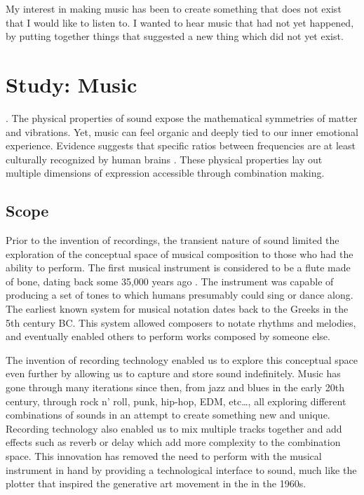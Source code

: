 \begin{savequote}[75mm]
My interest in making music has been to create something that does not exist that I would like to listen to. I wanted to hear music that had not yet happened, by putting together things that suggested a new thing which did not yet exist.
\end{savequote}

\chapter{Study: Music}




. The physical properties of sound expose the mathematical symmetries of matter and vibrations. Yet, music can feel organic and deeply tied to our inner emotional experience. Evidence suggests that specific ratios between frequencies are at least culturally recognized by human brains \citep{Jacoby2019}. These physical properties lay out multiple dimensions of expression accessible through combination making. 

\section{Scope}

Prior to the invention of recordings, the transient nature of sound limited the exploration of the conceptual space of musical composition to those who had the ability to perform. The first musical instrument is considered to be a flute made of bone, dating back some 35,000 years ago \citep{Conard2009}. The instrument was capable of producing a set of tones to which humans presumably could sing or dance along. The earliest known system for musical notation dates back to the Greeks in the 5th century BC. This system allowed composers to notate rhythms and melodies, and eventually enabled others to perform works composed by someone else.

The invention of recording technology enabled us to explore this conceptual space even further by allowing us to capture and store sound indefinitely. Music has gone through many iterations since then, from jazz and blues in the early 20th century, through rock n’ roll, punk, hip-hop, EDM, etc…, all exploring different combinations of sounds in an attempt to create something new and unique. Recording technology also enabled us to mix multiple tracks together and add effects such as reverb or delay which add more complexity to the combination space. This innovation has removed the need to perform with the musical instrument in hand by providing a technological interface to sound, much like the plotter that inspired the generative art movement in the in the 1960s.

